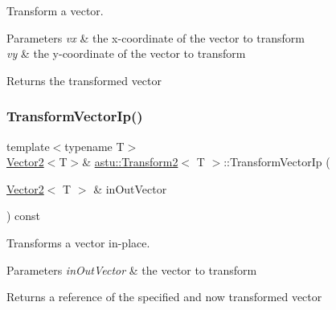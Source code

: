 Transform a vector.


\begin{DoxyParams}{Parameters}
{\em vx} & the x-\/coordinate of the vector to transform \\
\hline
{\em vy} & the y-\/coordinate of the vector to transform \\
\hline
\end{DoxyParams}
\begin{DoxyReturn}{Returns}
the transformed vector 
\end{DoxyReturn}
\mbox{\label{classastu_1_1Transform2_ab83170522e82b2cd83f3889976dae6b1}} 
\subsubsection{\texorpdfstring{Transform\+Vector\+Ip()}{TransformVectorIp()}}
{\footnotesize\ttfamily template$<$typename T$>$ \\
\hyperlink{classastu_1_1Vector2}{Vector2}$<$T$>$\& \hyperlink{classastu_1_1Transform2}{astu\+::\+Transform2}$<$ T $>$\+::Transform\+Vector\+Ip (\begin{DoxyParamCaption}\item[{\hyperlink{classastu_1_1Vector2}{Vector2}$<$ T $>$ \&}]{in\+Out\+Vector }\end{DoxyParamCaption}) const\hspace{0.3cm}{\ttfamily [inline]}}

Transforms a vector in-\/place.


\begin{DoxyParams}{Parameters}
{\em in\+Out\+Vector} & the vector to transform \\
\hline
\end{DoxyParams}
\begin{DoxyReturn}{Returns}
a reference of the specified and now transformed vector 
\end{DoxyReturn}
\mbox{\label{classastu_1_1Transform2_a287bd819b87dba7b75a739a63ef90aeb}} 

